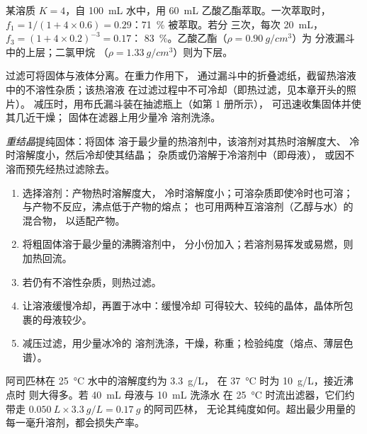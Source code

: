 \begin{example}[一份还是三份]
某溶质 $K = 4$，自 \qty{100}{mL} 水中，用
\qty{60}{mL} 乙酸乙酯萃取。一次萃取时，
$f_1 = 1/(1 + 4 \times 0.6) = 0.29$：\qty{71}{\percent} 被萃取。若分
三次，每次 \qty{20}{mL}，$f_3 = (1 + 4 \times 0.2)^{-3} = 0.17$：
\qty{83}{\percent}。乙酸乙酯（$\rho = \qty{0.90}{g/cm^3}$）为
分液漏斗中的上层；二氯甲烷
（$\rho = \qty{1.33}{g/cm^3}$）则为下层。
\end{example}

过滤可将固体与液体分离。在重力作用下，
通过漏斗中的折叠滤纸，截留热溶液中的不溶性杂质；该热溶液
在过滤过程中不可冷却（即热过滤，见本章开头的照片）。
减压时，用布氏漏斗装在抽滤瓶上（如第 1 册所示），
可迅速收集固体并使其几近干燥；
固体在滤器上用少量冷
溶剂洗涤。

\begin{definition}[重结晶]\label{def:b1:lab-techniques-1:recrystallisation}
\emph{重结晶}提纯固体：将固体
溶于最少量的热溶剂中，该溶剂对其热时溶解度大、
冷时溶解度小，然后冷却使其结晶；
杂质或仍溶解于冷溶剂中（即母液），
或因不溶而预先经热过滤除去。
\end{definition}

\begin{method}[固体重结晶]\label{met:b1:lab-techniques-1:recrystallise}
\begin{enumerate}
  \item 选择溶剂：产物热时溶解度大，
        冷时溶解度小；可溶杂质即使冷时也可溶；
        与产物不反应，沸点低于产物的熔点；
        也可用两种互溶溶剂（乙醇与水）的混合物，
        以适配产物。
  \item 将粗固体溶于最少量的沸腾溶剂中，
        分小份加入；若溶剂易挥发或易燃，则
        加热回流。
  \item 若仍有不溶性杂质，则热过滤。
  \item 让溶液缓慢冷却，再置于冰中：缓慢冷却
        可得较大、较纯的晶体，晶体所包裹的母液较少。
  \item 减压过滤，用少量冰冷的
        溶剂洗涤，干燥，称重；检验纯度（熔点、薄层色谱）。
\end{enumerate}
\end{method}

\begin{example}[纯度的代价]
阿司匹林在 \qty{25}{\celsius} 水中的溶解度约为 \qty{3.3}{g/L}，
在 \qty{37}{\celsius} 时为 \qty{10}{g/L}，接近沸点时
则大得多。若 \qty{40}{mL} 母液与 \qty{10}{mL} 洗涤水
在 \qty{25}{\celsius} 时流出滤器，它们约带走
$\qty{0.050}{L} \times \qty{3.3}{g/L} = \qty{0.17}{g}$ 的阿司匹林，
无论其纯度如何。超出最少用量的每一毫升溶剂，都会损失产率。
\end{example}

